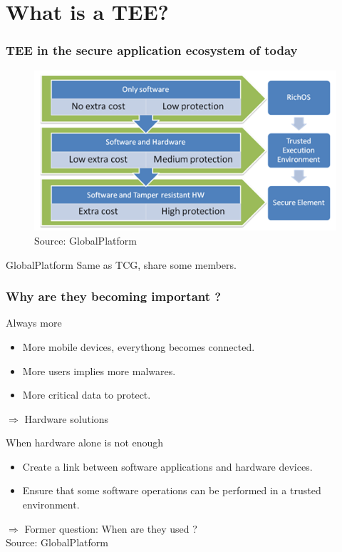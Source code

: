 \documentclass{beamer}
\begin{document}
\section{What is a TEE?}

\begin{frame}
    \frametitle{TEE in the secure application ecosystem of today}

    \begin{figure}[htb]
        \centering
        \includegraphics[scale=.6]{assets/tee-spot-img}
        \caption{Source: GlobalPlatform}
    \end{figure}
    \vfill
    \begin{block}{GlobalPlatform}
        Same as TCG, share some members.
    \end{block}
\end{frame}

\begin{frame}
    \frametitle{Why are they becoming important ?}

    \begin{block}{Always more}
        \begin{itemize}
            \item More mobile devices, everythong becomes connected.
            \item More users implies more malwares.
            \item More critical data to protect.
        \end{itemize}
        \medskip
        $\Rightarrow$ Hardware solutions
    \end{block}
    \vfill
    \begin{block}{When hardware alone is not enough}
        \begin{itemize}
            \item Create a link between software applications and hardware devices.\\
            \item Ensure that some software operations can be performed in a trusted environment.
        \end{itemize}
    \end{block}

    $\Rightarrow$ Former question: When are they used ?\\
    \medskip
    Source: GlobalPlatform
\end{frame}
\end{document}
